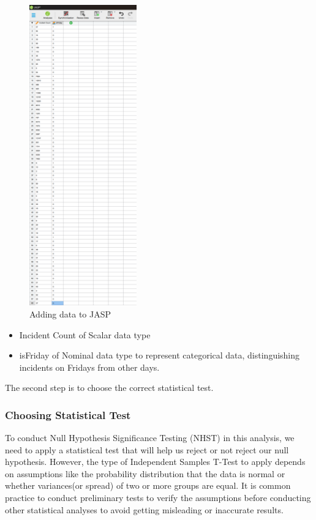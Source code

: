 \documentclass{article}
\begin{document}
\begin{figure}[H]
    \centering
    \includegraphics[width=0.5\linewidth, height=13cm]{Screenshot 2024-09-25 011255.png}
    \caption{Adding data to JASP}
    \label{fig:enter-label}
\end{figure}

\begin{itemize}
    \item Incident Count of Scalar data type
    \item isFriday of Nominal data type to represent categorical data, distinguishing incidents on Fridays from other days.
\end{itemize}


The second step is to choose the correct statistical test.

\subsubsection{Choosing Statistical Test}
To conduct Null Hypothesis Significance Testing (NHST) in this analysis, we need to apply a statistical test that will help us reject or not reject our null hypothesis. However, the type of Independent Samples T-Test to apply depends on assumptions like the probability distribution that the data is normal or whether variances(or spread) of two or more groups are equal. It is common practice to conduct preliminary tests to verify the assumptions before conducting other statistical analyses to avoid getting misleading or inaccurate results.
\end{document}
